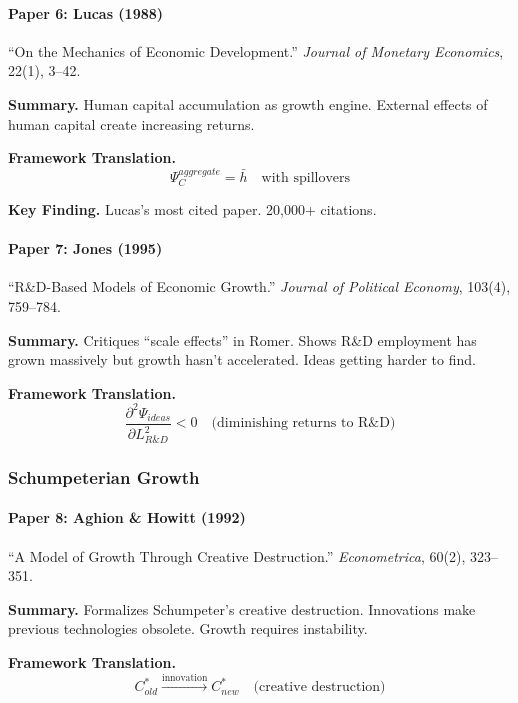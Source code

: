 \paragraph{Paper 6: Lucas (1988)}

``On the Mechanics of Economic Development.''
\textit{Journal of Monetary Economics}, 22(1), 3--42.

\textbf{Summary.}
Human capital accumulation as growth engine. External effects of human capital 
create increasing returns.

\textbf{Framework Translation.}
\begin{equation}
\Psi_C^{aggregate} = \bar{h} \quad \text{with spillovers}
\end{equation}

\textbf{Key Finding.}
Lucas's most cited paper. 20,000+ citations.

\paragraph{Paper 7: Jones (1995)}

``R\&D-Based Models of Economic Growth.''
\textit{Journal of Political Economy}, 103(4), 759--784.

\textbf{Summary.}
Critiques ``scale effects'' in Romer. Shows R\&D employment has grown 
massively but growth hasn't accelerated. Ideas getting harder to find.

\textbf{Framework Translation.}
\begin{equation}
\frac{\partial^2 \Psi_{ideas}}{\partial L_{R\&D}^2} < 0 \quad \text{(diminishing returns to R\&D)}
\end{equation}

\subsubsection{Schumpeterian Growth}

\paragraph{Paper 8: Aghion \& Howitt (1992)}

``A Model of Growth Through Creative Destruction.''
\textit{Econometrica}, 60(2), 323--351.

\textbf{Summary.}
Formalizes Schumpeter's creative destruction. Innovations make previous 
technologies obsolete. Growth requires instability.

\textbf{Framework Translation.}
\begin{equation}
C^*_{old} \xrightarrow{\text{innovation}} C^*_{new} \quad \text{(creative destruction)}
\end{equation}

